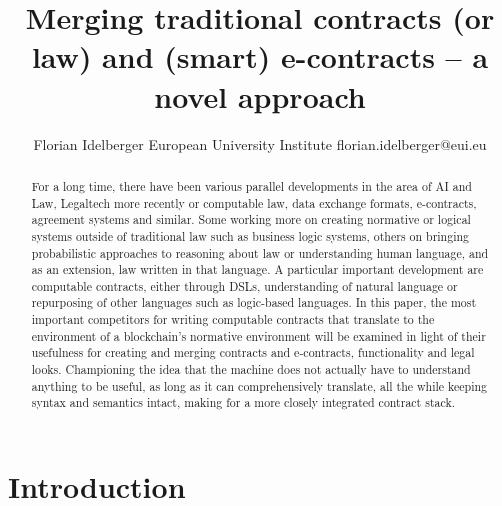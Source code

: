 \documentclass{article}
\title{Merging traditional contracts (or law) and (smart) e-contracts – a novel approach}
\author{
    Florian Idelberger
    \affiliations
    European University Institute
    \emails
    florian.idelberger@eui.eu
}
\begin{document}
\maketitle

\begin{abstract}
 For a long time, there have been various parallel developments in the area of AI and Law, Legaltech more recently or computable law, data exchange formats, e-contracts, agreement systems and similar. Some working more on creating normative or logical systems outside of traditional law such as business logic systems, others on bringing probabilistic approaches to reasoning about law or understanding human language, and as an extension, law written in that language. A particular important development are computable contracts, either through DSLs, understanding of natural language or repurposing of other languages such as logic-based languages. In this paper, the most important competitors for writing computable contracts that translate to the environment of a blockchain’s normative environment will be examined in light of their usefulness for creating and merging contracts and e-contracts, functionality and legal looks. Championing the idea that the machine does not actually have to understand anything to be useful, as long as it can comprehensively translate, all the while keeping syntax and semantics intact, making for a more closely integrated contract stack.
\end{abstract}

\section{Introduction}
\end{document}
